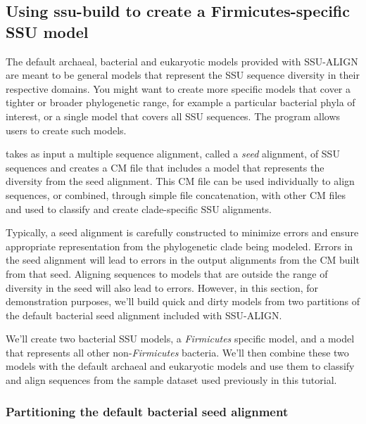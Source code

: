 \subsection{Using ssu-build to create a Firmicutes-specific SSU model}
\label{sec:tutorial-build-firmicutes}

The default archaeal, bacterial and eukaryotic models provided with
SSU-ALIGN are meant to be general models that represent the SSU
sequence diversity in their respective domains. You might want to
create more specific models that cover a tighter or broader
phylogenetic range, for example a particular bacterial phyla of
interest, or a single model that covers all SSU sequences. The
 program allows users to create such models. 

 takes as input a multiple sequence alignment, called
a \emph{seed} alignment, of SSU sequences and creates a CM file that
includes a model that represents the diversity from the seed
alignment. This CM file can be used individually to align sequences,
or combined, through simple file concatenation, with other CM files
and used to classify and create clade-specific SSU alignments.

Typically, a seed alignment is carefully constructed to minimize
errors and ensure appropriate representation from the phylogenetic
clade being modeled. Errors in the seed alignment will lead to errors
in the output alignments from the CM built from that seed. Aligning
sequences to models that are outside the range of diversity in the
seed will also lead to errors. However, in this section, for
demonstration purposes, we'll build quick and dirty models from two
partitions of the default bacterial seed alignment included with
SSU-ALIGN. 

We'll create two bacterial SSU models, a
\emph{Firmicutes} specific model, and a model that represents all
other non-\emph{Firmicutes} bacteria. We'll then combine these two
models with the default archaeal and eukaryotic models and use them to
classify and align sequences from the  sample dataset
used previously in this tutorial. 

\subsubsection{Partitioning the default bacterial seed alignment}

